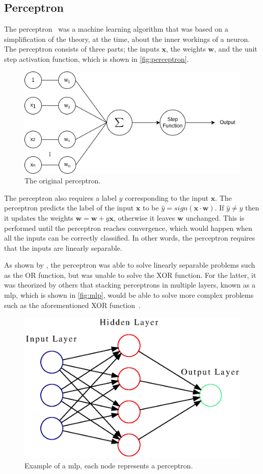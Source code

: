 \subsection{Perceptron}
The perceptron~\cite{perceptron, perceptron2} was a machine learning algorithm that was based on a simplification of the theory, at the time, about the inner workings of a neuron. The perceptron consists of three parts; the inputs $\mathbf{x}$, the weights $\mathbf{w}$, and the unit step activation function, which is shown in \autoref{fig:perceptron}.
\begin{figure}[htb]
    \centering
    \includegraphics[width=0.7\linewidth]{resources/related_works/perceptron}
    \caption[The Original Perceptron]{The original perceptron.}
    \label{fig:perceptron}
\end{figure}
\par
The perceptron also requires a label $y$ corresponding to the input $\mathbf{x}$. The perceptron predicts the label of the input $\mathbf{x}$ to be $\hat{y}=sign(\mathbf{x}\cdot\mathbf{w})$. If $\hat{y}\neq y$ then it updates the weights $\mathbf{w}=\mathbf{w}+y\mathbf{x}$, otherwise it leaves $\mathbf{w}$ unchanged. This is performed until the perceptron reaches convergence, which would happen when all the inputs can be correctly classified. In other words, the perceptron requires that the inputs are linearly separable.
\par
As shown by \textcite{perceptron3}, the perceptron was able to solve linearly separable problems such as the OR function, but was unable to solve the XOR function. For the latter, it was theorized by others that stacking perceptrons in multiple layers, known as a \gls*{mlp}, which is shown in \autoref{fig:mlp}, would be able to solve more complex problems such as the aforementioned XOR function~\cite{perceptron_misconceptions}.
\par
\begin{figure}[htb]
    \centering
    \includegraphics[width=0.7\linewidth]{resources/related_works/mlp.gv.eps}
    \caption[MLP Example]{Example of a \gls*{mlp}, each node represents a perceptron.}
    \label{fig:mlp}
\end{figure}
